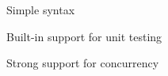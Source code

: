\begin{frame}
  \begin{center}
    Simple syntax
  \end{center}
\end{frame}

\begin{frame}
  \begin{center}
    Built-in support for unit testing
  \end{center}
\end{frame}

\begin{frame}
  \begin{center}
    Strong support for concurrency
  \end{center}
\end{frame}
